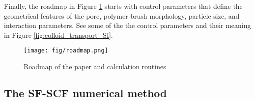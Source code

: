 \documentclass[10pt, a4paper]{article}
\begin{document}
\begin{multicols}{2}
Finally, the roadmap in Figure \ref{fig:paper_roadmap} starts with control parameters that define the geometrical features of the pore, polymer brush morphology, particle size, and interaction parameters.
See some of the the control parameters and their meaning in Figure \ref{fig:colloid_transport_SI}.

\begin{figure}[H]
    \texttt{[image: fig/roadmap.png]}
    \caption{Roadmap of the paper and calculation routines}
    \label{fig:paper_roadmap}
\end{figure}

\end{multicols}

\subsection*{The SF-SCF numerical method}
\end{document}
